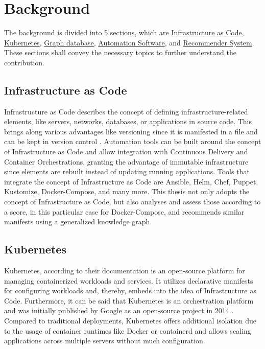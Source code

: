 \chapter{Background}
\label{sec:background}
The background is divided into 5 sections, which are \hyperref[sec:background-iac]{Infrastructure as Code}, \hyperref[sec:background-kubernetes]{Kubernetes}, \hyperref[sec:background-graph]{Graph database}, \hyperref[sec:background-automation]{Automation Software}, and \hyperref[sec:background-recommender]{Recommender System}. These sections shall convey the necessary topics to further understand the contribution.

\section{Infrastructure as Code}
\label{sec:background-iac}
Infrastructure as Code describes the concept of defining infrastructure-related elements, like servers, networks, databases, or applications in source code. This brings along various advantages like versioning since it is manifested in a file and can be kept in version control \cite{iacArmon}. Automation tools can be built around the concept of Infrastructure as Code and allow integration with Continuous Delivery and Container Orchestrations, granting the advantage of immutable infrastructure since elements are rebuilt instead of updating running applications. Tools that integrate the concept of Infrastructure as Code are Ansible, Helm, Chef, Puppet, Kustomize, Docker-Compose, and many more. This thesis not only adopts the concept of Infrastructure as Code, but also analyses and assess those according to a score, in this particular case for Docker-Compose, and recommends similar manifests using a generalized knowledge graph.

\section{Kubernetes}
\label{sec:background-kubernetes}
Kubernetes, according to their documentation \cite{whatKubernetes} is an open-source platform for managing containerized workloads and services. It utilizes declarative manifests for configuring workloads and, thereby, embeds into the idea of Infrastructure as Code. Furthermore, it can be said that Kubernetes is an orchestration platform and was initially published by Google as an open-source project in 2014 \cite{kubernetes2014}\cite{googleContrib}. Compared to traditional deployments, Kubernetes offers additional isolation due to the usage of container runtimes like Docker or containerd and allows scaling applications across multiple servers without much configuration.

